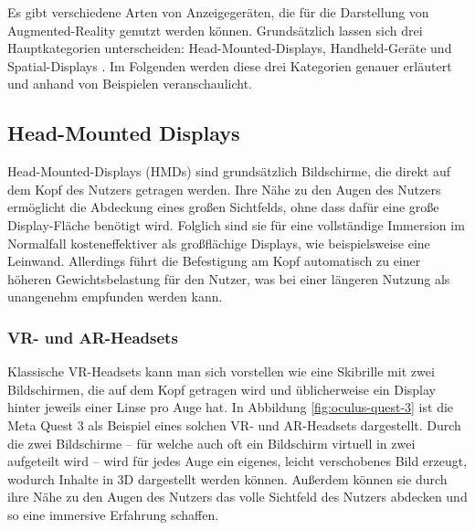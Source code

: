   Es gibt verschiedene Arten von Anzeigegeräten, die für die Darstellung von Augmented-Reality genutzt werden können.
  Grundsätzlich lassen sich drei Hauptkategorien unterscheiden: Head-Mounted-Displays, Handheld-Geräte und Spatial-Displays \autocite[][S. 346]{Carmigniani2011}.
  Im Folgenden werden diese drei Kategorien genauer erläutert und anhand von Beispielen veranschaulicht.

  \newpage

  \subsection{Head-Mounted Displays}
    \label{section:hmds}
    Head-Mounted-Displays (HMDs) sind grundsätzlich Bildschirme, die direkt auf dem Kopf des Nutzers getragen werden.
    Ihre Nähe zu den Augen des Nutzers ermöglicht die Abdeckung eines großen Sichtfelds, ohne dass dafür eine große Display-Fläche benötigt wird.
    Folglich sind sie für eine vollständige Immersion im Normalfall kosteneffektiver als großflächige Displays, wie beispielsweise eine Leinwand.
    Allerdings führt die Befestigung am Kopf automatisch zu einer höheren Gewichtsbelastung für den Nutzer, was bei einer längeren Nutzung als unangenehm empfunden werden kann.


    \subsubsection{VR- und AR-Headsets}

    Klassische VR-Headsets kann man sich vorstellen wie eine Skibrille mit zwei Bildschirmen, die auf dem Kopf getragen wird und üblicherweise ein Display hinter jeweils einer Linse pro Auge hat.
    In Abbildung \ref{fig:oculus-quest-3} ist die Meta Quest 3 als Beispiel eines solchen VR- und AR-Headsets dargestellt.
    Durch die zwei Bildschirme -- für welche auch oft ein Bildschirm virtuell in zwei aufgeteilt wird -- wird für jedes Auge ein eigenes, leicht verschobenes Bild erzeugt, wodurch Inhalte in 3D dargestellt werden können.
    Außerdem können sie durch ihre Nähe zu den Augen des Nutzers das volle Sichtfeld des Nutzers abdecken und so eine immersive Erfahrung schaffen.

